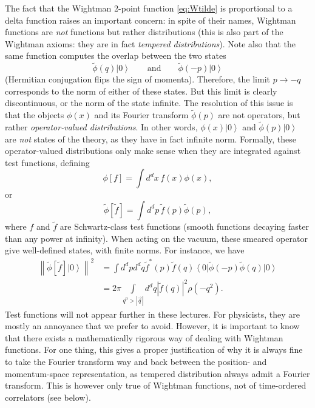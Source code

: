 \documentclass[a4paper,12pt]{article}
\newcommand{\ket}[1]{\left| #1 \right\rangle}
\newcommand{\bra}[1]{\left\langle #1 \right|}
\numberwithin{equation}{section}
\begin{document}
The fact that the Wightman 2-point function \eqref{eq:Wtilde} is proportional to a delta function raises an important concern: in spite of their names, Wightman functions are \emph{not} functions but rather distributions (this is also part of the Wightman axioms: they are in fact \emph{tempered distributions}). Note also that the same function computes the overlap between the two states 
\begin{equation}
	\widetilde{\phi}(q) \ket{0}
	\qquad\text{and}\qquad
	\widetilde{\phi}(-p) \ket{0}
\end{equation}
(Hermitian conjugation flips the sign of momenta). Therefore, the limit $p \to - q$ corresponds to the norm of either of these states. But this limit is clearly discontinuous, or the norm of the state infinite.
The resolution of this issue is that the objects $\phi(x)$ and its Fourier transform $\widetilde{\phi}(p)$ are not operators, but rather \emph{operator-valued distributions}. In other words, $\phi(x) \ket{0}$
and $\widetilde{\phi}(p) \ket{0}$ are \emph{not} states of the theory, as they have in fact infinite norm. Formally, these operator-valued distributions only make sense when they are integrated against test functions, defining
\begin{equation}
	\phi[f] = \int d^dx \, f(x) \phi(x),
\end{equation}
or 
\begin{equation}
	\widetilde{\phi}[\tilde{f}] = \int d^dp \, \tilde{f}(p)
	\widetilde{\phi}(p),
\end{equation}
where $f$ and $\widetilde{f}$ are Schwartz-class test functions (smooth functions decaying faster than any power at infinity).
When acting on the vacuum, these smeared operator give well-defined states, with finite norms. For instance, we have
\begin{align}
	\left\| \widetilde{\phi}[\tilde{f}] \ket{0} \right\|^2
	&= \int d^dp d^dq \tilde{f}^*(p) \tilde{f}(q)
	\bra{0} \widetilde{\phi}(-p) \widetilde{\phi}(q) \ket{0}
	\nonumber \\
	&= 2\pi
	\int\limits_{q^0 > \left| \vec{q} \right|} \!\!
	d^dq \left| \tilde{f}(q) \right|^2
	\rho(-q^2).
	\label{eq:norm}
\end{align}
Test functions will not appear further in these lectures. For physicists, they are mostly an annoyance that we prefer to avoid. However, it is important to know that there exists a mathematically rigorous way of dealing with Wightman functions.
For one thing, this gives a proper justification of why it is always fine to take the Fourier transform way and back between the position- and momentum-space representation, as tempered distribution always admit a Fourier transform.
This is however only true of Wightman functions, not of time-ordered correlators (see below).
\end{document}
